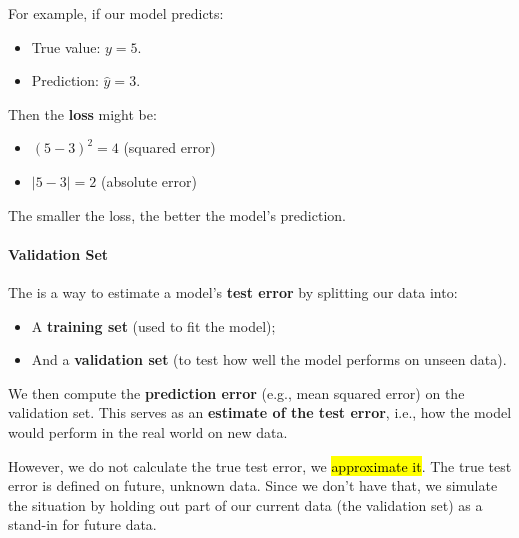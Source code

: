 \begin{itemize}
    For example, if our model predicts:
    \begin{itemize}
        \item True value: $y = 5$.
        \item Prediction: $\hat{y} = 3$.
    \end{itemize}
    Then the \textbf{loss} might be:
    \begin{itemize}
        \item $\left(5-3\right)^{2} = 4$ (squared error)
        \item $\left|5-3\right| = 2$ (absolute error)
    \end{itemize}
    The smaller the loss, the better the model's prediction.
\end{itemize}

\newpage

\paragraph{Validation Set}\label{paragraph: Validation Set}

The  is a way to estimate a model's \textbf{test error} by splitting our data into:
\begin{itemize}
    \item A \textbf{training set} (used to fit the model);
    \item And a \textbf{validation set} (to test how well the model performs on unseen data).
\end{itemize}
We then compute the \textbf{prediction error} (e.g., mean squared error) on the validation set. This serves as an \textbf{estimate of the test error}, i.e., how the model would perform in the real world on new data.

\highspace
However, we do not calculate the true test error, we \hl{approximate it}. The true test error is defined on future, unknown data. Since we don't have that, we simulate the situation by holding out part of our current data (the validation set) as a stand-in for future data.

